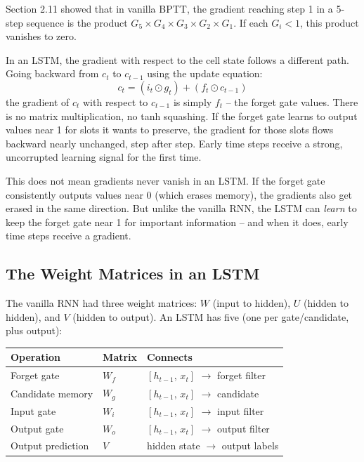 \documentclass[12pt,a4paper]{article}
\begin{document}
Section 2.11 showed that in vanilla BPTT, the gradient reaching step 1 in a 5-step
sequence is the product $G_5 \times G_4 \times G_3 \times G_2 \times G_1$. If each
$G_i < 1$, this product vanishes to zero.

In an LSTM, the gradient with respect to the cell state follows a different path. Going
backward from $c_t$ to $c_{t-1}$ using the update equation:
\[
c_t = (i_t \odot g_t) + (f_t \odot c_{t-1})
\]
the gradient of $c_t$ with respect to $c_{t-1}$ is simply $f_t$ -- the forget gate
values. There is no matrix multiplication, no tanh squashing. If the forget gate
learns to output values near 1 for slots it wants to preserve, the gradient for those
slots flows backward nearly unchanged, step after step. Early time steps receive a
strong, uncorrupted learning signal for the first time.

This does not mean gradients never vanish in an LSTM. If the forget gate consistently
outputs values near 0 (which erases memory), the gradients also get erased in the same
direction. But unlike the vanilla RNN, the LSTM can \textit{learn} to keep the forget
gate near 1 for important information -- and when it does, early time steps receive a
gradient.

\subsection{The Weight Matrices in an LSTM}

The vanilla RNN had three weight matrices: $W$ (input to hidden), $U$ (hidden to
hidden), and $V$ (hidden to output). An LSTM has five (one per gate/candidate, plus
output):

\begin{center}
\begin{tabular}{|l|l|l|}
\hline
\textbf{Operation} & \textbf{Matrix} & \textbf{Connects} \\
\hline
Forget gate & $W_f$ & $[h_{t-1},\, x_t]$ $\to$ forget filter \\
\hline
Candidate memory & $W_g$ & $[h_{t-1},\, x_t]$ $\to$ candidate \\
\hline
Input gate & $W_i$ & $[h_{t-1},\, x_t]$ $\to$ input filter \\
\hline
Output gate & $W_o$ & $[h_{t-1},\, x_t]$ $\to$ output filter \\
\hline
Output prediction & $V$ & hidden state $\to$ output labels \\
\hline
\end{tabular}
\end{center}
\end{document}
